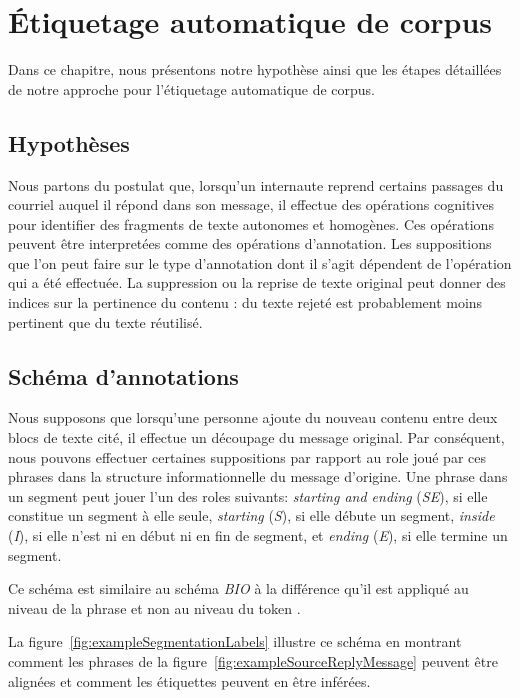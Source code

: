 
\chapter{Étiquetage automatique de corpus}

\label{ch:methodology_for_automatic_corpora_annotation}

Dans ce chapitre, nous présentons notre hypothèse ainsi que les étapes détaillées de notre approche pour l'étiquetage automatique de corpus.

\section{Hypothèses}

Nous partons du postulat que, lorsqu'un internaute reprend certains passages du courriel auquel il répond dans son message, il effectue des opérations cognitives pour identifier des fragments de texte autonomes et homogènes. Ces opérations peuvent être interpretées comme des opérations d'annotation. Les suppositions que l'on peut faire sur le type d'annotation dont il s'agit dépendent de l'opération qui a été effectuée. La suppression ou la reprise de texte original peut donner des indices sur la pertinence du contenu : du texte rejeté est probablement moins pertinent que du texte réutilisé.

\section{Schéma d'annotations}

Nous supposons que lorsqu'une personne ajoute du nouveau contenu entre deux blocs de texte cité, il effectue un découpage du message original. Par conséquent, nous pouvons effectuer certaines suppositions par rapport au role joué par ces phrases dans la structure informationnelle du message d'origine. Une phrase dans un segment peut jouer l'un des roles suivants: \emph{starting and ending} (\textit{SE}), si elle constitue un segment à elle seule, \emph{starting} (\textit{S}), si elle débute un segment, \emph{inside} (\textit{I}), si elle n'est ni en début ni en fin de segment, et \emph{ending} (\textit{E}), si elle termine un segment.

Ce schéma est similaire au schéma \emph{BIO} à la différence qu'il est appliqué au niveau de la phrase et non au niveau du token \cite{ratinov:2009:conll}.

La figure~\ref{fig:exampleSegmentationLabels} illustre ce schéma en montrant comment les phrases de la figure~\ref{fig:exampleSourceReplyMessage} peuvent être alignées et comment les étiquettes peuvent en être inférées.

